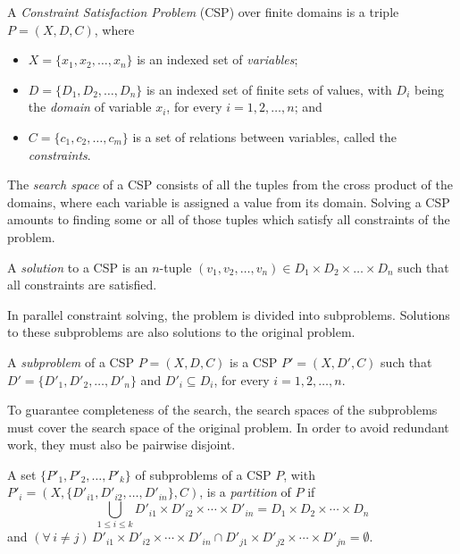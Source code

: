 \documentclass{llncs}
\begin{document}
\begin{definition}[CSP]
  A \emph{Constraint Satisfaction Problem} (CSP) over finite domains
  is a triple $P = (X,D,C)$, where
  \begin{itemize}
  \item $X = \{x_1, x_2, \ldots, x_n\}$ is an indexed set of
    \emph{variables};
  \item $D = \{D_1, D_2, \ldots, D_n\}$ is an indexed set of finite
    sets of values, with $D_i$ being the \emph{domain} of variable
    $x_i$, for every $i = 1,2,\ldots,n$; and
  \item $C = \{c_1, c_2, \ldots, c_m\}$ is a set of relations between
    variables, called the \emph{constraints}.
  \end{itemize}
\end{definition}

The \emph{search space} of a CSP consists of all the tuples from the
cross product of the domains, where each variable is assigned a value
from its domain. Solving a CSP amounts to finding some or all of those
tuples which satisfy all constraints of the problem.

\begin{definition}[Solution]
  A \emph{solution} to a CSP is an $n$-tuple $(v_1,v_2,\ldots,v_n) \in
  D_1 \times D_2 \times \ldots \times D_n$ such that all constraints
  are satisfied.
\end{definition}

In parallel constraint solving, the problem is divided into
subproblems. Solutions to these subproblems are also solutions to the
original problem.

\begin{definition}[Subproblem]
  A \emph{subproblem} of a CSP $P = (X,D,C)$ is a CSP $P' = (X,D',C)$
  such that $D' = \{D'_1, D'_2, \ldots, D'_n\}$ and $D'_i \subseteq
  D_i$, for every $i = 1,2,\ldots,n$.
\end{definition}

To guarantee completeness of the search, the search spaces of the
subproblems must cover the search space of the original problem. In
order to avoid redundant work, they must also be pairwise disjoint.

\begin{definition}[Partition]
  A set $\{P'_1, P'_2, \ldots, P'_k\}$ of subproblems of a CSP $P$,
  with $P'_i = (X,\{D'_{i1}, D'_{i2}, \ldots, D'_{in}\}, C)$, is a
  \emph{partition} of $P$ if
  \[
    \bigcup_{1 \le i \le k} D'_{i1} \times D'_{i2} \times \cdots
      \times D'_{in} = D_1 \times D_2 \times \cdots \times D_n
  \]
  and $(\forall\, i \ne j)\, D'_{i1} \times D'_{i2} \times \cdots
  \times D'_{in} \cap D'_{j1} \times D'_{j2} \times \cdots \times
  D'_{jn} = \emptyset\mbox{.}$
\end{definition}
\end{document}
